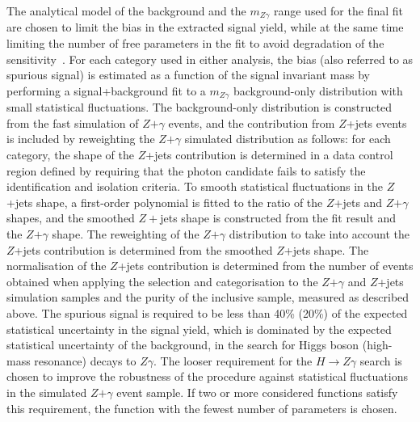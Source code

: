 The analytical model of the background and the $m_{Z\gamma}$ range used for the final fit are chosen to limit the bias in the extracted signal 
yield, while at the same time limiting the number of free parameters in the fit to avoid degradation
of the sensitivity~\cite{atlas-higgs}. For
each category used in either analysis, the 
bias (also referred to as spurious signal) is estimated as a function of the signal invariant
mass by performing a signal+background fit to a 
$m_{Z\gamma}$ background-only distribution with small statistical fluctuations. 
The background-only distribution is
constructed from the fast simulation of $Z$$+$$\gamma$ events, and the contribution from 
$Z$+jets events is included by reweighting the $Z$$+$$\gamma$ simulated distribution as follows: 
for each category, the shape of the $Z$+jets contribution is
determined in a data control region defined by requiring that the photon candidate fails to satisfy the identification 
and isolation criteria. To smooth statistical fluctuations in the $Z$+jets shape, a first-order
polynomial is fitted to the ratio of the $Z$+jets and $Z$$+$$\gamma$ shapes, and the smoothed $Z+$jets shape 
is constructed from the fit result and the $Z$$+$$\gamma$ shape. The reweighting of the $Z$$+$$\gamma$ 
distribution to take into account the $Z$+jets contribution is determined from the smoothed
$Z$+jets shape. The normalisation of the $Z$+jets contribution is determined from the number of
events obtained when applying the selection and categorisation to the $Z$$+$$\gamma$ and $Z$+jets simulation
samples and the purity of the inclusive sample, measured as described above.
The spurious signal is required to be less than 40\% (20\%) of the expected statistical
uncertainty in the signal yield, which is dominated by the expected statistical uncertainty of 
the background, in the search for Higgs boson (high-mass resonance) decays to 
$Z\gamma$. The looser requirement for the $H\to Z\gamma$ search is chosen to improve the robustness
of the procedure against statistical fluctuations in the simulated $Z$$+$$\gamma$ event sample.
If two or more considered functions satisfy this requirement, the
function with the fewest number of parameters is chosen. 

